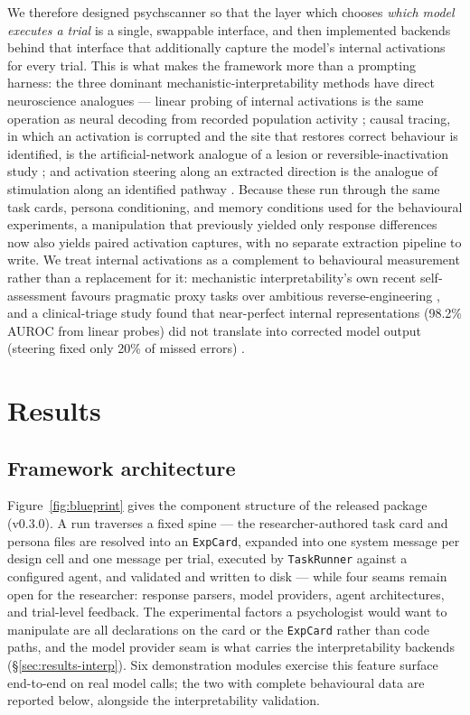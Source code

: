 \documentclass[pdflatex,sn-nature]{sn-jnl}
\begin{document}
We therefore designed psychscanner so that the layer which chooses
\emph{which model executes a trial} is a single, swappable interface, and
then implemented backends behind that interface that additionally capture
the model's internal activations for every trial. This is what makes the
framework more than a prompting harness: the three dominant
mechanistic-interpretability methods have direct neuroscience analogues —
linear probing of internal activations is the same operation as neural
decoding from recorded population activity
\citep{li2023othello}; causal tracing, in which an activation is corrupted
and the site that restores correct behaviour is identified, is the
artificial-network analogue of a lesion or reversible-inactivation study
\citep{meng2022rome}; and activation steering along an extracted direction
is the analogue of stimulation along an identified pathway
\citep{chen2025personavectors,burns2023ccs}. Because these run through the
same task cards, persona conditioning, and memory conditions used for the
behavioural experiments, a manipulation that previously yielded only
response differences now also yields paired activation captures, with no
separate extraction pipeline to write. We treat internal activations as a
complement to behavioural measurement rather than a replacement for it:
mechanistic interpretability's own recent self-assessment favours pragmatic
proxy tasks over ambitious reverse-engineering \citep{nanda2025pragmatic},
and a clinical-triage study found that near-perfect internal
representations (98.2\% AUROC from linear probes) did not translate into
corrected model output (steering fixed only 20\% of missed errors)
\citep{basu2026actionability}.

\section{Results}\label{sec:results}

\subsection{Framework architecture}\label{sec:results-arch}

Figure~\ref{fig:blueprint} gives the component structure of the released
package (v0.3.0). A run traverses a fixed spine — the researcher-authored
task card and persona files are resolved into an \texttt{ExpCard}, expanded
into one system message per design cell and one message per trial, executed
by \texttt{TaskRunner} against a configured agent, and validated and written
to disk — while four seams remain open for the researcher: response parsers,
model providers, agent architectures, and trial-level feedback. The
experimental factors a psychologist would want to manipulate are all
declarations on the card or the \texttt{ExpCard} rather than code paths, and
the model provider seam is what carries the interpretability backends
(\S\ref{sec:results-interp}). Six demonstration modules exercise this
feature surface end-to-end on real model calls; the two with complete
behavioural data are reported below, alongside the interpretability
validation.
\end{document}
